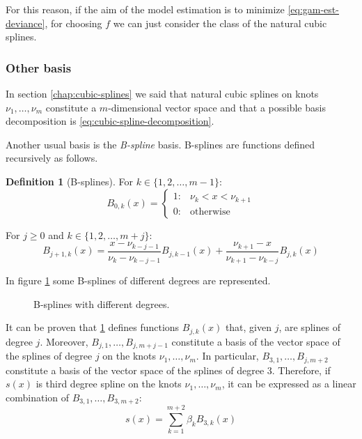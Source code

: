 \documentclass[a4paper, nobind]{templates/ociamthesis}
\theoremstyle{definition}
\newtheorem{definition}{Definition}[chapter]
\theoremstyle{definition}
\theoremstyle{definition}
\theoremstyle{remark}
\begin{document}
For this reason, if the aim of the model estimation is to minimize \eqref{eq:gam-est-deviance}, for choosing \(f\) we can just consider the class of the natural cubic splines.

\hypertarget{other-basis}{%
\subsubsection{Other basis}\label{other-basis}}

In section \ref{chap:cubic-splines} we said that natural cubic splines on knots \(\nu_1, \dots, \nu_m\) constitute a \(m\)-dimensional vector space and that a possible basis decomposition is \eqref{eq:cubic-spline-decomposition}.

Another usual basis is the \emph{B-spline} basis. B-splines are functions defined recursively as follows.

\begin{definition}[B-splines]
\label{def:b-splines} \iffalse (B-splines) \fi{} For \(k\in\{1,2,\dots,m-1\}\):
\[
B_{0,k}(x) = 
\begin{cases}
1: & \nu_k < x < \nu_{k+1} \\
0: & \text{otherwise}
\end{cases}
\]

For \(j \ge 0\) and \(k\in\{1,2,\dots,m+j\}\):
\[
B_{j+1,k}(x) = 
\frac{x-\nu_{k-j-1}}{\nu_{k}-\nu_{k-j-1}} B_{j,k-1}(x)
+ \frac{\nu_{k+1}-x}{\nu_{k+1}-\nu_{k-j}} B_{j,k}(x)
\]
\end{definition}

In figure \ref{fig:b-splines-plot} some B-splines of different degrees are represented.





\begin{figure}[!hbtp]

{\centering {}

}

\caption{B-splines with different degrees.}\label{fig:b-splines-plot}
\end{figure}

It can be proven that \ref{def:b-splines} defines functions \(B_{j,k}(x)\) that, given \(j\), are splines of degree \(j\). Moreover, \(B_{j,1}, \dots, B_{j,m+j-1}\) constitute a basis of the vector space of the splines of degree \(j\) on the knots \(\nu_1, \dots, \nu_m\). In particular, \(B_{3,1}, \dots, B_{j,m+2}\) constitute a basis of the vector space of the splines of degree \(3\). Therefore, if \(s(x)\) is third degree spline on the knots \(\nu_1, \dots, \nu_m\), it can be expressed as a linear combination of \(B_{3,1}, \dots, B_{3,m+2}\):
\[
s(x) = \sum_{k=1}^{m+2}{\beta_{k}B_{3,k}(x)}
\]
\end{document}
